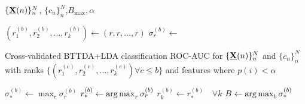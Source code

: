 \begin{algorithmic}[1]
  \Require $\{\underline{\mathbf{X}}(n)\}_n^N$, $\{c_n\}_n^N$,$B_\text{max}, \alpha$

  \State $\textstyle{(r_1^{(b)},r_2^{(b)},\ldots,r_k^{(b)}) \gets (r,r,\ldots,r)}$
  \State $\sigma^{(b)}_r \gets$ \parbox[t]{5cm}{Cross-validated BTTDA+LDA classification
  ROC-AUC for $\{\underline{\mathbf{X}}(n)\}_n^N$ and $\{c_n\}_n^N$ with ranks  $\{(r_1^{(c)},r_2^{(c)},\ldots,r_k^{(c)}) \forall
c\leq b\}$ and features where $p(i)<\alpha$}
  \EndFor
  \State $\textstyle{\sigma^{(b)}_* \gets \max_r\sigma^{(b)}_r}$
  \State $\textstyle{r^{(b)}_* \gets \operatorname*{arg\,max}_r\sigma^{(b)}_r}$
  \State $r_k^{(b)}\gets r^{(b)}_*\quad\forall k$
  \EndFor
  \State $\textstyle{B\gets\operatorname*{arg\,max}_b\sigma^{(b)}_*}$
\end{algorithmic}
